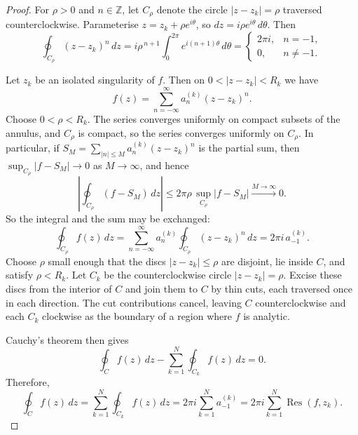\documentclass{article}
\begin{document}
\begin{proof}
For $\rho>0$ and $n\in\mathbb{Z}$, let $C_\rho$ denote the circle $|z-z_k|=\rho$ traversed counterclockwise. Parameterise $z=z_k+\rho e^{i\theta}$, so $dz=i\rho e^{i\theta}\,d\theta$. Then
    \begin{equation}
        \oint_{C_\rho}(z-z_k)^n\,dz = i\rho^{\,n+1}\int_0^{2\pi}e^{i(n+1)\theta}\,d\theta =
        \begin{cases}
            2\pi i, & n=-1,\\
            0, & n\neq-1.
        \end{cases}
    \end{equation}

 Let $z_k$ be an isolated singularity of $f$. Then on $0<|z-z_k|<R_k$ we have
    \begin{equation}
        f(z)=\sum_{n=-\infty}^{\infty}a_n^{(k)}(z-z_k)^n .
    \end{equation}
    Choose $0<\rho<R_k$. The series converges uniformly on compact subsets of the annulus, and $C_\rho$ is compact, so the series converges uniformly on $C_\rho$. In particular, if $S_M=\sum_{|n|\le M}a_n^{(k)}(z-z_k)^n$ is the partial sum, then $\sup_{C_\rho}|f-S_M|\to 0$ as $M\to\infty$, and hence
    \begin{equation}
        \left|\oint_{C_\rho}(f-S_M)\,dz\right| \le 2\pi\rho\,\sup_{C_\rho}|f-S_M| \xrightarrow{M\to\infty} 0 .
    \end{equation}
    So the integral and the sum may be exchanged:
    \begin{equation}
        \oint_{C_\rho}f(z)\,dz = \sum_{n=-\infty}^{\infty}a_n^{(k)}\oint_{C_\rho}(z-z_k)^n\,dz = 2\pi i\,a_{-1}^{(k)} .
    \end{equation}
 Choose $\rho$ small enough that the discs $|z-z_k|\le\rho$ are disjoint, lie inside $C$, and satisfy $\rho<R_k$. Let $C_k$ be the counterclockwise circle $|z-z_k|=\rho$. Excise these discs from the interior of $C$ and join them to $C$ by thin cuts, each traversed once in each direction. The cut contributions cancel, leaving $C$ counterclockwise and each $C_k$ clockwise as the boundary of a region where $f$ is analytic. 
 
 Cauchy's theorem then gives
    \begin{equation}
        \oint_C f(z)\,dz - \sum_{k=1}^{N}\oint_{C_k}f(z)\,dz = 0 .
    \end{equation}
    Therefore,
    \begin{equation}
        \oint_C f(z)\,dz = \sum_{k=1}^{N}\oint_{C_k}f(z)\,dz = 2\pi i\sum_{k=1}^{N}a_{-1}^{(k)} = 2\pi i\sum_{k=1}^{N}\operatorname{Res}(f,z_k).
    \end{equation}
\end{proof}
\end{document}
